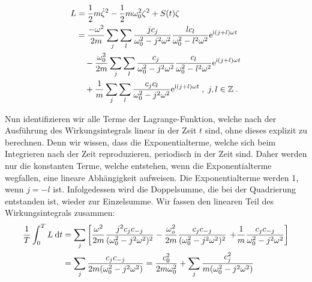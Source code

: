       \begin{align}
        \begin{split}
          L &= \frac{1}{2}m\dot \zeta^2 - \frac{1}{2}m\omega_0^2\zeta^2 + S(t)\zeta \\
           &=\frac{-\omega^2}{2m} \sum_j \sum_l \frac{jc_j}{\omega_0^2-j^2\omega^2} \frac{lc_l}{\omega_0^2-l^2\omega^2} \text e^{\text i(j+l)\omega t}\\
           &\quad-\frac{\omega_0^2}{2m} \sum_j \sum_l \frac{c_j}{\omega_0^2-j^2\omega^2} \frac{c_l}{\omega_0^2-l^2\omega^2} \text e^{\text i(j+l)\omega t}\\
           &\quad + \frac{1}{m} \sum_j \sum_l \frac{c_jc_l}{\omega_0^2-j^2\omega^2} \text e^{\text i(j+l)\omega t}\; , \; j,l \in \mathbb{Z} \; .
         \end{split}
       \end{align}
       \fi

       Nun identifizieren wir alle Terme der Lagrange-Funktion, welche nach der Ausführung des Wirkungsintegrals linear in der Zeit $t$ sind, ohne dieses explizit zu berechnen.
       Denn wir wissen, dass die Exponentialterme, welche sich beim Integrieren nach der Zeit reproduzieren, periodisch in der Zeit sind.
       Daher werden nur die konstanten Terme, welche entstehen, wenn die Exponentialterme wegfallen, eine lineare Abhängigkeit aufweisen.
       Die Exponentialterme werden 1, wenn $j=-l$ ist.
       Infolgedessen wird die Doppelsumme, die bei der Quadrierung entstanden ist, wieder zur Einzelsumme.
       Wir fassen den linearen Teil des Wirkungsintegrals zusammen:
       \begin{align}
         \begin{split}
           \frac{1}{T} \int_0^T L \: \text d t
           &= \sum_j \left[\frac{\omega^2}{2m} \frac{j^2c_jc_{-j}}{(\omega_0^2-j^2\omega^2)^2}
           - \frac{\omega_o^2}{2m} \frac{c_jc_{-j}}{(\omega_0^2-j^2\omega^2)^2} \right.
           \left. +\frac{1}{m} \frac{c_jc_{-j}}{\omega_0^2-j^2\omega^2}
           \right]\\
           &= \sum_j \frac{c_jc_{-j}}{2m(\omega_0^2-j^2\omega^2)} = \frac{c_0^2}{2m\omega_0^2} + \sum_{j} \frac{c_j^2}{m(\omega_0^2-j^2\omega^2)}
         \end{split}
       \end{align}


